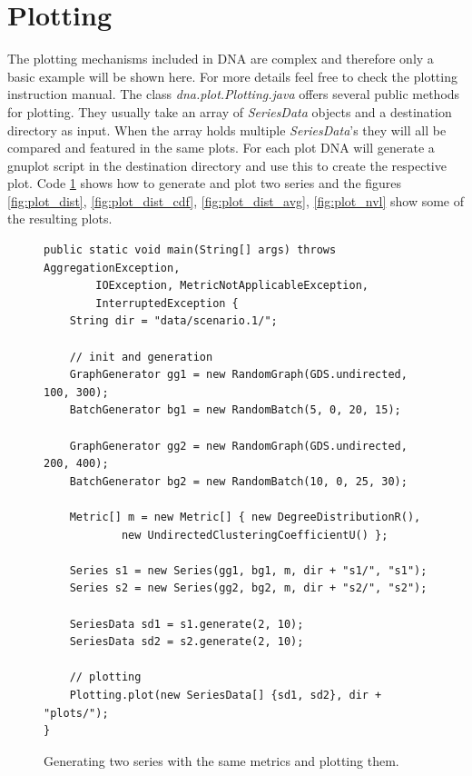 \section{Plotting}
The plotting mechanisms included in DNA are complex and therefore only a basic example will be shown here. For more details feel free to check the plotting instruction manual. The class \textit{dna.plot.Plotting.java} offers several public methods for plotting. They usually take an array of \textit{SeriesData} objects and a destination directory as input. When the array holds multiple \textit{SeriesData}'s they will all be compared and featured in the same plots. For each plot DNA will generate a gnuplot script in the destination directory and use this to create the respective plot. Code \ref{code:plot-example} shows how to generate and plot two series and the figures \ref{fig:plot_dist}, \ref{fig:plot_dist_cdf}, \ref{fig:plot_dist_avg}, \ref{fig:plot_nvl} show some of the resulting plots.
\begin{figure} [h]
\begin{lstlisting}
public static void main(String[] args) throws AggregationException,
		IOException, MetricNotApplicableException,
		InterruptedException {
	String dir = "data/scenario.1/";
	
	// init and generation
	GraphGenerator gg1 = new RandomGraph(GDS.undirected, 100, 300);
	BatchGenerator bg1 = new RandomBatch(5, 0, 20, 15);
	
	GraphGenerator gg2 = new RandomGraph(GDS.undirected, 200, 400);
	BatchGenerator bg2 = new RandomBatch(10, 0, 25, 30);

	Metric[] m = new Metric[] { new DegreeDistributionR(),
			new UndirectedClusteringCoefficientU() };

	Series s1 = new Series(gg1, bg1, m, dir + "s1/", "s1");
	Series s2 = new Series(gg2, bg2, m, dir + "s2/", "s2");
	
	SeriesData sd1 = s1.generate(2, 10);
	SeriesData sd2 = s2.generate(2, 10);

	// plotting
	Plotting.plot(new SeriesData[] {sd1, sd2}, dir + "plots/");
}
\end{lstlisting}
\caption{Generating two series with the same metrics and plotting them.}
\label{code:plot-example}
\end{figure}

